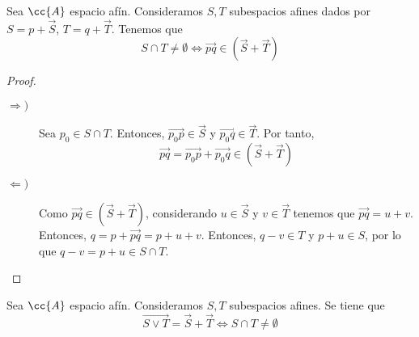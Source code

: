 \begin{prop}\label{prop:IntersecNoVacia}
    Sea $\cc{A}$ espacio afín. Consideramos $S,T$ subespacios afines dados por $S=p+\vec{S}$, $T=q+\vec{T}$. Tenemos que
    $$S\cap T\neq \emptyset \Longleftrightarrow \vec{pq}\in \left(\vec{S}+\vec{T}\right)$$
\end{prop}
\begin{proof}\
    \begin{description}
        \item[$\Longrightarrow)$] Sea $p_0\in S\cap T$. Entonces, $\vec{p_0p}\in \vec{S}$ y $\vec{p_0q}\in \vec{T}$. Por tanto,
        $$\vec{pq}=\vec{p_0p}+\vec{p_0q}\in (\vec{S}+\vec{T})$$

        \item[$\Longleftarrow)$] Como $\vec{pq}\in (\vec{S}+\vec{T})$, considerando $u\in \vec{S}$ y $v\in \vec{T}$ tenemos que $\vec{pq}=u+v$. Entonces, $q=p+\vec{pq}=p+u+v$. Entonces, $q-v\in T$ y $p+u\in S$, por lo que $q-v=p+u\in S\cap T$.
    \end{description}
\end{proof}
\begin{coro}
    Sea $\cc{A}$ espacio afín. Consideramos $S,T$ subespacios afines. Se tiene que
    $$\vec{S\vee T} = \vec{S} + \vec{T} \Longleftrightarrow S\cap T\neq \emptyset$$
\end{coro}



